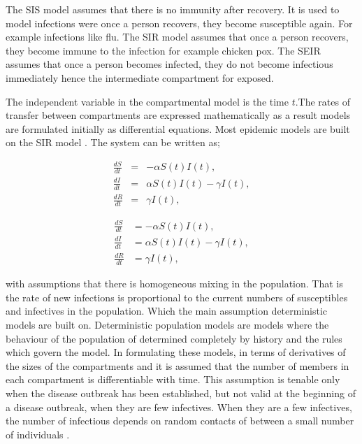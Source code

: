   
The SIS model assumes that there is no immunity after recovery. It is used to model infections were once a person recovers, they become susceptible again. For example infections like flu.
The SIR model assumes that once a person recovers, they become immune to the infection for example chicken pox.
The SEIR assumes that once a person becomes infected, they do not become infectious immediately hence the intermediate compartment for exposed. 


The independent variable in the compartmental model is the time $t$.The rates of transfer between compartments are expressed mathematically as a result models are formulated initially as differential equations. Most epidemic models are built on the SIR model \citep{m1925applications}. The system can be written as;

\begin{center}
\begin{equation} \label{eqn1_1}
\begin{array}{ccl}
\frac{dS}{dt} &= &-\alpha S(t) I(t),\\
 \frac{dI}{dt} &=& \alpha S(t) I(t) - \gamma  I(t), \\
 \frac{dR}{dt} &= &\gamma  I(t),
\end{array}  
\end{equation}
\end{center}

\begin{align}
\frac{dS}{dt} &= -\alpha S(t) I(t), \nonumber  \\
\frac{dI}{dt} &= \alpha S(t) I(t) - \gamma  I(t), \\
\frac{dR}{dt} &= \gamma  I(t), \nonumber  
\end{align}


with assumptions that there is homogeneous mixing in the population. That is the rate of new infections is proportional to the current numbers of susceptibles and infectives in the population. Which
the main assumption deterministic models are built on. Deterministic population  models are models where the behaviour of the population of determined completely by history and the rules which govern the model. In formulating these models, in terms of derivatives of the sizes of the compartments and it is assumed that the number of members in each compartment is differentiable with time. This assumption is tenable only when the disease outbreak has been established, but not valid at the beginning of a disease outbreak, when they are few infectives. When they are a few infectives, the number of infectious depends on random contacts of between a small number of individuals \citep{brauer2012mathematical}.
 
